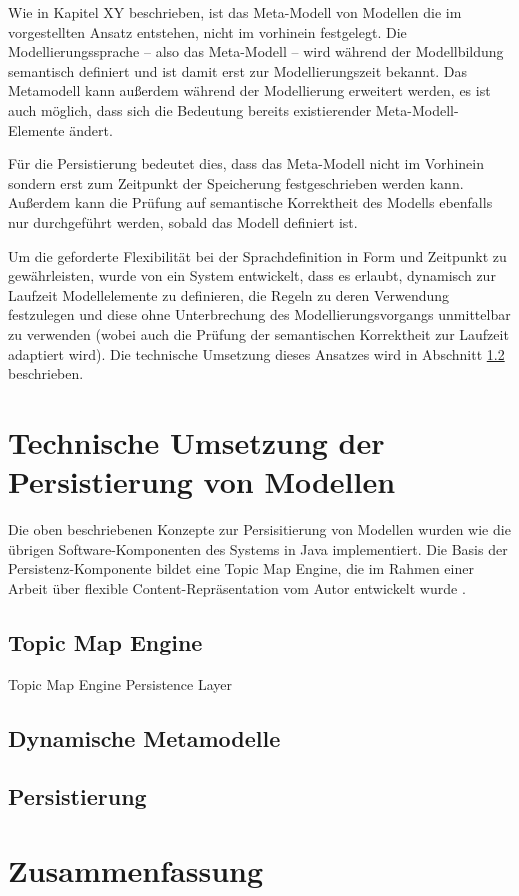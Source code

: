 Wie in Kapitel XY beschrieben, ist das Meta-Modell von Modellen die im vorgestellten Ansatz entstehen, nicht im vorhinein festgelegt. Die Modellierungssprache -- also das Meta-Modell -- wird während der Modellbildung semantisch definiert und ist damit erst zur Modellierungszeit bekannt. Das Metamodell kann außerdem während der Modellierung erweitert werden, es ist auch möglich, dass sich die Bedeutung bereits existierender Meta-Modell-Elemente ändert.

Für die Persistierung bedeutet dies, dass das Meta-Modell nicht im Vorhinein sondern erst zum Zeitpunkt der Speicherung festgeschrieben werden kann. Außerdem kann die Prüfung auf semantische Korrektheit des Modells ebenfalls nur durchgeführt werden, sobald das Modell definiert ist. 

Um die geforderte Flexibilität bei der Sprachdefinition in Form und Zeitpunkt zu gewährleisten, wurde von \citet{Neubauer08} ein System entwickelt, dass es erlaubt, dynamisch zur Laufzeit Modellelemente zu definieren, die Regeln zu deren Verwendung festzulegen und diese ohne Unterbrechung des Modellierungsvorgangs unmittelbar zu verwenden (wobei auch die Prüfung der semantischen Korrektheit zur Laufzeit adaptiert wird). Die technische Umsetzung dieses Ansatzes wird in Abschnitt \ref{sec:dynamische_metamodelle} beschrieben.



\section{Technische Umsetzung der Persistierung von Modellen} %
\label{sec:technische_umsetzung_der_persistierung_von_modellen}

Die oben beschriebenen Konzepte zur Persisitierung von Modellen wurden wie die übrigen Software-Komponenten des Systems in Java implementiert. Die Basis der Persistenz-Komponente bildet eine Topic Map Engine, die im Rahmen einer Arbeit über flexible Content-Repräsentation vom Autor entwickelt wurde \citep{Oppl07}.

\subsection{Topic Map Engine}
Topic Map Engine Persistence Layer

\subsection{Dynamische Metamodelle}
\label{sec:dynamische_metamodelle}

\subsection{Persistierung}

\section{Zusammenfassung} %
\label{sec:persistierung_zusammenfassung}

